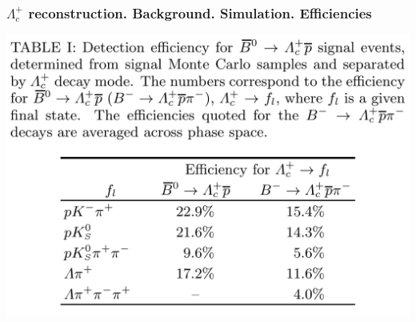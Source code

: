 \documentclass[10pt, aspectratio=169]{beamer}
\begin{document}
\begin{frame}[label=simulation]%
  \frametitle{$\Lambda_c^+$ reconstruction. Background. Simulation. Efficiencies}
  \centering
  \includegraphics[width=.7\textwidth]{figures/002/table-efficiencies}



\end{frame}%
\end{document}

